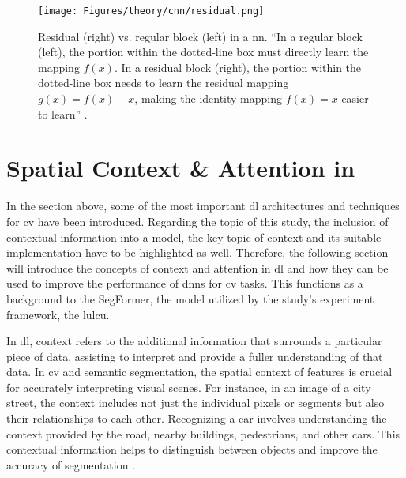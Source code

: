 \begin{figure}[htb]
    \centering
    \texttt{[image: Figures/theory/cnn/residual.png]}
    \caption[Residual Learning Block]{Residual (right) vs. regular block (left) in a \gls{nn}. \enquote{In a regular block (left), the portion within the dotted-line box must directly learn the mapping \( f(x) \). In a residual block (right), the portion within the dotted-line box needs to learn the residual mapping \( g(x) = f(x) - x \), making the identity mapping \( f(x) = x \) easier to learn} \autocite[313]{Zhang.Lipton.ea2023}.}
    \label{fig:residual}
\end{figure}

\section{Spatial Context \& Attention in }

In the section above, some of the most important \gls{dl} architectures and techniques for \gls{cv} have been introduced. Regarding the topic of this study, the inclusion of contextual information into a model, the key topic of context and its suitable implementation have to be highlighted as well. Therefore, the following section will introduce the concepts of context and attention in \gls{dl} and how they can be used to improve the performance of \glspl{dnn} for \gls{cv} tasks. This functions as a background to the SegFormer, the model utilized by the study's experiment framework, the \gls{lulcu}.

In \gls{dl}, context refers to the additional information that surrounds a particular piece of data, assisting to interpret and provide a fuller understanding of that data. In \gls{cv} and semantic segmentation, the spatial context of features is crucial for accurately interpreting visual scenes. For instance, in an image of a city street, the context includes not just the individual pixels or segments but also their relationships to each other. Recognizing a car involves understanding the context provided by the road, nearby buildings, pedestrians, and other cars. This contextual information helps to distinguish between objects and improve the accuracy of segmentation \autocite{Ding.Jiang.ea2020,Zhang.Zhang.ea2022}.

